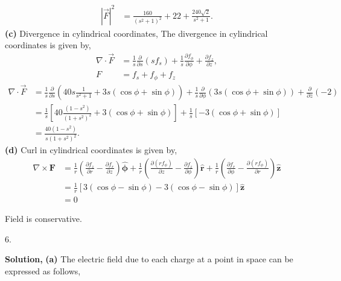 \documentclass{article}
\begin{document}
\begin{align*}
|\vec{F}|^2 &= 
    \frac{160}{(s^2+1)^2} 
    + 22 
    + \frac{240\sqrt{2}}{s^2+1}.
\end{align*}
\textbf{(c)} Divergence in cylindrical coordinates,
The divergence in cylindrical coordinates is given by,
\begin{align*}
\nabla \cdot \vec{F} &= 
    \frac{1}{s} 
    \frac{\partial}{\partial s}(s f_s) 
    + 
    \frac{1}{s} 
    \frac{\partial f_\phi}{\partial \phi} 
    + 
    \frac{\partial f_z}{\partial z},
\\
F &= 
        f_s
        + f_{\phi} + f_z
\end{align*}
\begin{align*}
\nabla \cdot\vec{F}&= 
\frac{1}{s} \frac{\partial}{\partial s} 
\left( 
40s \frac{1}{s^2+1} + 3s (\cos\phi + \sin\phi) 
\right) 
+ \frac{1}{s} \frac{\partial}{\partial \phi} 
\left( 
3s (\cos\phi + \sin\phi) 
\right) 
+ \frac{\partial}{\partial z} (-2) \\
&= \frac{1}{s} 
\left[ 
40 \frac{\left( 1 - s^2 \right)}{ 
\left( 1 + s^2 \right)^2 }
+ 3 (\cos\phi + \sin\phi)
\right] 
+ \frac{1}{s} 
\left[ -3    (\cos\phi + \sin\phi) 
\right] \\
&= \frac{40 (1 - s^2)}{s (1 + s^2)^2}.
\end{align*}
\textbf{(d)} Curl in cylindrical coordinates is given by,
\begin{align*}
\nabla \times \mathbf{F} &= \frac{1}{r} \left( \frac{\partial f_z}{\partial r} - \frac{\partial f_r}{\partial z} \right) \hat{\boldsymbol{\phi}} 
+ \frac{1}{r} \left( \frac{\partial (r f_\phi)}{\partial z} - \frac{\partial f_z}{\partial \phi} \right) \hat{\mathbf{r}} 
+ \frac{1}{r} \left( \frac{\partial f_r}{\partial \phi} - \frac{\partial (r f_\phi)}{\partial r} \right) \hat{\mathbf{z}} \\
&= \frac{1}{r} [3 (\cos\phi - \sin\phi) - 3 (\cos\phi - \sin\phi)] \hat{\mathbf{z}} \\
&= 0
\end{align*}

Field is conservative.\newline \newline


6. \newline

\textbf{Solution,}\newline
\textbf{(a)} The electric field due to each charge at a point in space can be expressed as follows,
\end{document}

